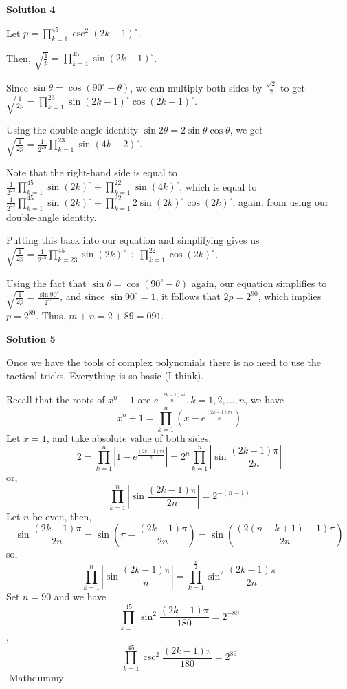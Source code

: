 \begin{enumerate}
 



\textbf{Solution 4}

Let $p=\prod_{k=1}^{45} \csc^2(2k-1)^\circ$.

 Then, $\sqrt{\frac{1}{p}}=\prod_{k=1}^{45} \sin(2k-1)^\circ$.

 Since $\sin\theta=\cos(90^{\circ}-\theta)$, we can multiply both sides by $\frac{\sqrt{2}}{2}$ to get $\sqrt{\frac{1}{2p}}=\prod_{k=1}^{23} \sin(2k-1)^\circ\cos(2k-1)^\circ$.

 Using the double-angle identity $\sin2\theta=2\sin\theta\cos\theta$, we get $\sqrt{\frac{1}{2p}}=\frac{1}{2^{23}}\prod_{k=1}^{23} \sin(4k-2)^\circ$.

 Note that the right-hand side is equal to $\frac{1}{2^{23}}\prod_{k=1}^{45} \sin(2k)^\circ\div \prod_{k=1}^{22} \sin(4k)^\circ$, which is equal to $\frac{1}{2^{23}}\prod_{k=1}^{45} \sin(2k)^\circ\div \prod_{k=1}^{22} 2\sin(2k)^\circ\cos(2k)^\circ$, again, from using our double-angle identity.

 Putting this back into our equation and simplifying gives us $\sqrt{\frac{1}{2p}}=\frac{1}{2^{45}}\prod_{k=23}^{45} \sin(2k)^\circ\div \prod_{k=1}^{22} \cos(2k)^\circ$.

 Using the fact that $\sin\theta=\cos(90^{\circ}-\theta)$ again, our equation simplifies to $\sqrt{\frac{1}{2p}}=\frac{\sin90^\circ}{2^{45}}$, and since $\sin90^\circ=1$, it follows that $2p = 2^{90}$, which implies $p=2^{89}$. Thus, $m+n=2+89=\boxed{091}$.

 



\textbf{Solution 5}

Once we have the tools of complex polynomials there is no need to use the tactical tricks. Everything is so basic (I think).

 Recall that the roots of $x^n+1$ are $e^{\frac{(2k-1)\pi i}{n}}, k=1,2,...,n$, we have
 \[x^n + 1 = \prod_{k=1}^{n}(x-e^{\frac{(2k-1)\pi i}{n}})\]Let $x=1$, and take absolute value of both sides,  
 \[2 = \prod_{k=1}^{n}|1-e^{\frac{(2k-1)\pi i}{n}}|= 2^n\prod_{k=1}^{n}|\sin\frac{(2k-1)\pi}{2n}|\]or, 
 \[\prod_{k=1}^{n}|\sin\frac{(2k-1)\pi}{2n}| = 2^{-(n-1)}\]Let $n$ be even, then,
 \[\sin\frac{(2k-1)\pi}{2n} = \sin\left(\pi - \frac{(2k-1)\pi}{2n}\right) = \sin\left(\frac{(2(n-k+1)-1)\pi}{2n}\right)\]so,
 \[\prod_{k=1}^{n}\left|\sin\frac{(2k-1)\pi}{n}\right| = \prod_{k=1}^{\frac{n}{2}}\sin^2\frac{(2k-1)\pi}{2n}\]Set $n=90$ and we have
 \[\prod_{k=1}^{45}\sin^2\frac{(2k-1)\pi}{180} = 2^{-89}\],
 \[\prod_{k=1}^{45}\csc^2\frac{(2k-1)\pi}{180} = 2^{89}\]-Mathdummy


\end{enumerate}
